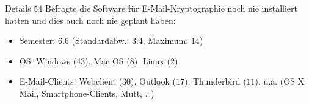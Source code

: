 \documentclass[]{beamer}
\begin{document}
\begin{frame}{Details}
	$54$ Befragte die Software für E-Mail-Kryptographie noch nie installiert hatten und dies auch noch nie geplant haben:
	\begin{itemize}
		\item Semester: $6.6$ (Standardabw.: $3.4$, Maximum: $14$)
		\item OS: Windows ($43$), Mac OS ($8$), Linux ($2$)
		\item E-Mail-Clients: Webclient ($30$), Outlook ($17$), Thunderbird ($11$), u.a. (OS X Mail, Smartphone-Clients, Mutt, \ldots)
	\end{itemize}
\end{frame}
\end{document}
